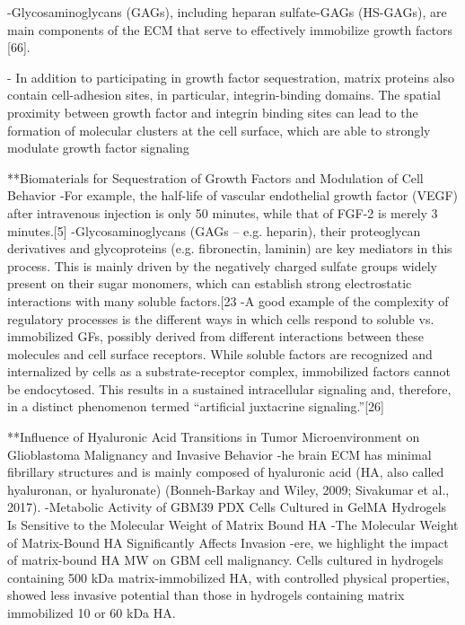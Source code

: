 \documentclass[11pt,a4paper]{article}
\begin{document}
-Glycosaminoglycans (GAGs), including heparan sulfate-GAGs (HS-GAGs), are main components of the ECM that serve to effectively immobilize growth factors [66]. 

- In addition to participating in growth factor sequestration, matrix proteins also contain cell-adhesion sites, in particular, integrin-binding domains. The spatial proximity between growth factor and integrin binding sites can lead to the formation of molecular clusters at the cell surface, which are able to strongly modulate growth factor signaling

**Biomaterials for Sequestration of Growth Factors and Modulation of Cell Behavior
-For example, the half-life of
vascular endothelial growth factor (VEGF) after intravenous injection is only 50 minutes, while that
of FGF-2 is merely 3 minutes.[5] 
-Glycosaminoglycans (GAGs – e.g. heparin), their proteoglycan derivatives and glycoproteins (e.g.
fibronectin, laminin) are key mediators in this process. This is mainly driven by the negatively
charged sulfate groups widely present on their sugar monomers, which can establish strong
electrostatic interactions with many soluble factors.[23
-A good example of the complexity of regulatory processes is the different ways in which cells
respond to soluble vs. immobilized GFs, possibly derived from different interactions between these
molecules and cell surface receptors. While soluble factors are recognized and internalized by cells
as a substrate-receptor complex, immobilized factors cannot be endocytosed. This results in a
sustained intracellular signaling and, therefore, in a distinct phenomenon termed “artificial juxtacrine
signaling.”[26] 


**Influence of Hyaluronic Acid Transitions in Tumor Microenvironment on Glioblastoma Malignancy and Invasive Behavior
-he brain ECM has minimal fibrillary structures and is mainly composed of hyaluronic acid (HA, also called hyaluronan, or hyaluronate) (Bonneh-Barkay and Wiley, 2009; Sivakumar et al., 2017).
-Metabolic Activity of GBM39 PDX Cells Cultured in GelMA Hydrogels Is Sensitive to the Molecular Weight of Matrix Bound HA
-The Molecular Weight of Matrix-Bound HA Significantly Affects Invasion
-ere, we highlight the impact of matrix-bound HA MW on GBM cell malignancy. Cells cultured in hydrogels containing 500 kDa matrix-immobilized HA, with controlled physical properties, showed less invasive potential than those in hydrogels containing matrix immobilized 10 or 60 kDa HA.
\end{document}
